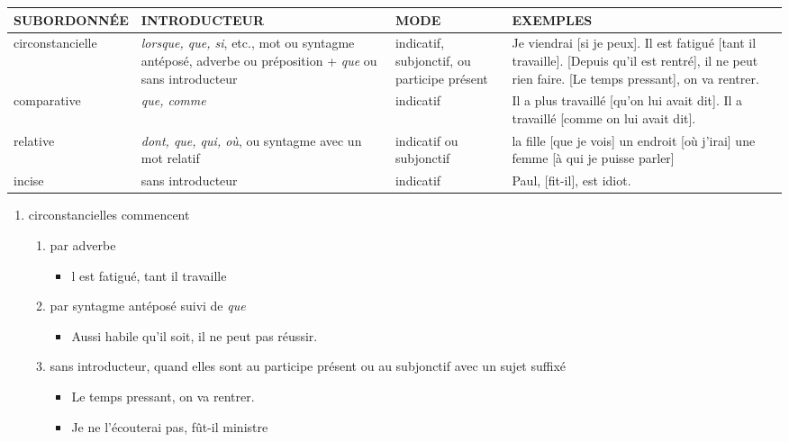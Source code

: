 \documentclass[UTF8]{report}
\begin{document}
\begin{table}[H]
    \centering

\begin{adjustbox}{max width =\textwidth}
    \begin{tabular}{|>{\RaggedRight}p{3cm}|>{\RaggedRight}p{5.5cm}|>{\RaggedRight}p{3.5cm}|>{\RaggedRight}p{5cm}|}
    \hline
    \rowcolor{cyan!20}
    \textbf{SUBORDONNÉE} & \textbf{INTRODUCTEUR} & \textbf{MODE} & \textbf{EXEMPLES} \\
    \hline
    circonstancielle & \textit{lorsque, que, si}, etc., mot ou syntagme antéposé, adverbe ou préposition + \textit{que} ou sans introducteur & indicatif, subjonctif, ou participe présent & Je viendrai [si je peux]. Il est fatigué [tant il travaille]. [Depuis qu'il est rentré], il ne peut rien faire. [Le temps pressant], on va rentrer. \\
    \hline
    comparative & \textit{que, comme} & indicatif & Il a plus travaillé [qu'on lui avait dit]. Il a travaillé [comme on lui avait dit]. \\
    \hline
    relative & \textit{dont, que, qui, où}, ou syntagme avec un mot relatif & indicatif ou subjonctif & la fille [que je vois] \newline un endroit [où j'irai] \newline une femme [à qui je puisse parler] \\
    \hline
    incise & sans introducteur & indicatif & Paul, [fit-il], est idiot. \\
    \hline
    \end{tabular}
\end{adjustbox}

\end{table}

\begin{enumerate}
    \item circonstancielles commencent
    \begin{enumerate}
        \item par adverbe
        \begin{itemize}
            \item l est fatigué, tant il travaille
        \end{itemize}
        \item par syntagme antéposé suivi de \textit{que}
        \begin{itemize}
            \item Aussi habile qu’il soit, il ne peut pas réussir.
        \end{itemize}
        \item sans introducteur, quand elles sont au participe présent ou au subjonctif avec un sujet suffixé
        \begin{itemize}
            \item Le temps pressant, on va rentrer.
            \item Je ne l’écouterai pas, fût-il ministre
        \end{itemize}
    \end{enumerate}
\end{enumerate}
\end{document}
